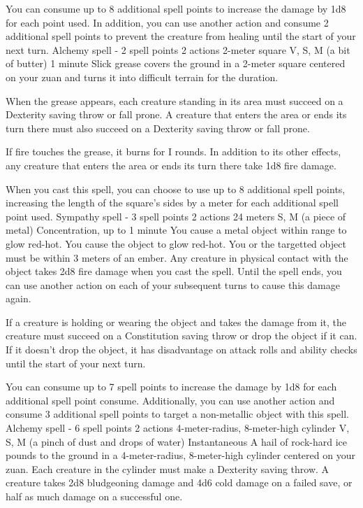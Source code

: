     You can consume up to 8 additional spell points to increase the damage by 1d8 for each point used.
    In addition, you can use another action and consume 2 additional spell points to prevent the creature from healing until the start of your next turn.
    {Alchemy spell - 2 spell points}
    {2 actions}
    {2-meter square}
    {V, S, M (a bit of butter)}
    {1 minute}
    Slick grease covers the ground in a 2-meter square centered on your zuan and turns it into difficult terrain for the duration.

    When the grease appears, each creature standing in its area must succeed on a Dexterity saving throw or fall prone.
    A creature that enters the area or ends its turn there must also succeed on a Dexterity saving throw or fall prone.

    If fire touches the grease, it burns for I rounds.
    In addition to its other effects, any creature that enters the area or ends its turn there take 1d8 fire damage.

    When you cast this spell, you can choose to use up to 8 additional spell points, increasing the length of the square's sides by a meter for each additional spell point used.
    {Sympathy spell - 3 spell points}
    {2 actions}
    {24 meters}
    {S, M (a piece of metal)}
    {Concentration, up to 1 minute}
    You cause a metal object within range to glow red-hot.
    You cause the object to glow red-hot.
    You or the targetted object must be within 3 meters of an ember.
    Any creature in physical contact with the object takes 2d8 fire damage when you cast the spell.
    Until the spell ends, you can use another action on each of your subsequent turns to cause this damage again.

    If a creature is holding or wearing the object and takes the damage from it, the creature must succeed on a Constitution saving throw or drop the object if it can.
    If it doesn't drop the object, it has disadvantage on attack rolls and ability checks until the start of your next turn.

    You can consume up to 7 spell points to increase the damage by 1d8 for each additional spell point consume.
    Additionally, you can use another action and consume 3 additional spell points to target a non-metallic object with this spell.
    {Alchemy spell - 6 spell points}
    {2 actions}
    {4-meter-radius, 8-meter-high cylinder}
    {V, S, M (a pinch of dust and drops of water)}
    {Instantaneous}
    A hail of rock-hard ice pounds to the ground in a 4-meter-radius, 8-meter-high cylinder centered on your zuan.
    Each creature in the cylinder must make a Dexterity saving throw.
    A creature takes 2d8 bludgeoning damage and 4d6 cold damage on a failed save, or half as much damage on a successful one.

